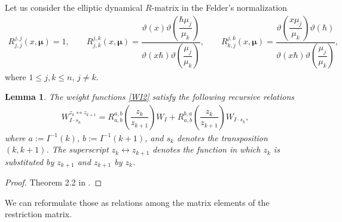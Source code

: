 \documentclass[pdftex]{sigma}
\def\mub{{\boldsymbol\mu}}
\let\thi\vartheta
\numberwithin{equation}{section}
\newtheorem{Lemma}[Theorem]{Lemma}
\begin{document}
Let us consider the elliptic dynamical $R$-matrix in the Felder's normalization
\begin{gather*}
R^{j,j}_{j,j}(x,\mub)=1, \qquad R^{j,k}_{j,k}(x,\mub)=\dfrac{\thi(x) \thi \left( \dfrac{\hbar \mu_j}{\mu_{k}} \right)}{\thi(x \hbar) \thi \left( \dfrac{\mu_j}{\mu_k} \right)}, \qquad R^{j,k}_{k,j}(x,\mub)=\dfrac{\thi \left( \dfrac{x \mu_j}{\mu_k} \right) \thi(\hbar)}{\thi(x \hbar) \thi \left( \dfrac{\mu_j}{\mu_k} \right)} ,
\end{gather*}
where $1\leq j, k\leq n$, $j\neq k$.

\begin{Lemma}The weight functions \eqref{WI2} satisfy the following recursive relations
\begin{gather*}
W_{I \cdot s_{k}}^{z_k\leftrightarrow z_{k+1}}=R^{a,b}_{a,b} \left( \dfrac{z_k}{z_{k+1}} \right) W_{I}+R^{b,a}_{a,b} \left( \dfrac{z_k}{z_{k+1}} \right) W_{I \cdot s_k},
\end{gather*}
where $a := I^{-1} (k)$, $b := I^{-1} (k+1)$, and $s_k$ denotes the transposition $(k,k+1)$. The superscript $z_k\leftrightarrow z_{k+1}$ denotes the function in which $z_k$ is substituted by $z_{k+1}$ and $z_{k+1}$ by $z_{k}$.
\end{Lemma}
\begin{proof}Theorem 2.2 in \cite{RTV}.
\end{proof}

We can reformulate those as relations among the matrix elements of the restriction matrix.
\end{document}
